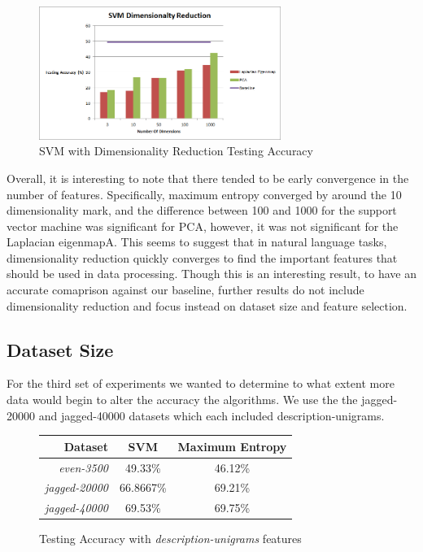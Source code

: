 \begin{figure}[!h]
\begin{center}
\caption{SVM with Dimensionality Reduction Testing Accuracy}
\includegraphics[width=0.7\textwidth]{SVM_Dimensionality_Reduction.png}
\end{center}
\end{figure}

Overall, it is interesting to note that there tended to be early convergence in the number of features.  Specifically, maximum entropy converged by around the 10 dimensionality mark, and the difference between 100 and 1000 for the support vector machine was significant for PCA, however, it was not significant for the Laplacian eigenmapA.  This seems to suggest that in natural language tasks, dimensionality reduction quickly converges to find the important features that should be used in data processing.  Though this is an interesting result, to have an accurate comaprison against our baseline, further results do not include dimensionality reduction and focus instead on dataset size and feature selection.

\subsection{Dataset Size}
For the third set of experiments we wanted to determine to what extent more data would begin to alter the accuracy the algorithms.  We use the the jagged-20000 and jagged-40000 datasets which each included description-unigrams.

\begin{figure}[!h]
\begin{center}
\caption{Testing Accuracy with \emph{description-unigrams} features}
\begin{tabular}{| r | c | c |}
\hline
Dataset & SVM & Maximum Entropy \\ \hline
\emph{even-3500} & 49.33\% & 46.12\% \\ \hline
\emph{jagged-20000} & 66.8667\% & 69.21\% \\ \hline
\emph{jagged-40000} & 69.53\% & 69.75\% \\ \hline
\end{tabular}
\end{center}
\end{figure}

